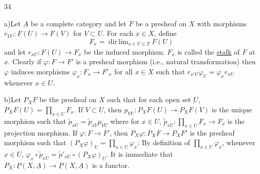 \hfill 34

a)\quad Let $\underline A$ be a complete category and let $F$ be a presheaf
on $X$ with morphisms $r_{VU}:F(U)\longrightarrow F(V)$ for $V\subset U$.
For each $x\in X$, define
\[
F_x=\mathop{\mathrm{dir\,lim}}_{x\in U\in\underline T}F(U)
\]
and let $r_{xU}:F(U)\longrightarrow F_x$ be the induced morphism.
$F_x$ is called the \uline{stalk} of $F$ at $x$.
Clearly if $\varphi:F\longrightarrow F'$ is a presheaf morphism
(i.e., natural transformation) then $\varphi$ induces morphisms
$\varphi_x:F_x\longrightarrow F'_x$ for all $x\in X$ such that
$r_{x'U}\varphi_U=\varphi_xr_{xU}$ whenever $x\in U$.

b)\quad Let $P_XF$ be the presheaf on $X$ such that for each open set $U$,
$P_XF(U)=\prod_{x\in U}F_x$.
If $V\subset U$, then $p_{VU}:P_XF(U)\longrightarrow P_XF(V)$ is the unique
morphism such that $\tilde p_{xU}=\tilde p_{xV}p_{VU}$ where for $x\in U$,
$\tilde p_{xU}:\prod_{x\in U}F_x\longrightarrow F_x$ is the projection morphism.
If $\varphi:F\longrightarrow F'$, then
$P_X\varphi:P_XF\longrightarrow P_XF'$ is the presheaf morphism such that
$(P_X\varphi)_U=\prod_{x\in U}\varphi_x$:
By definition of $\prod_{x\in U}\varphi_x$, whenever $x\in U$,
$\varphi_x\circ\tilde p_{xU}=\tilde p'_{xU}\circ(P_X\varphi)_U$.
It is immediate that $P_X:\underline P(X,\underline A)\longrightarrow
\underline P(X,\underline A)$ is a functor.

